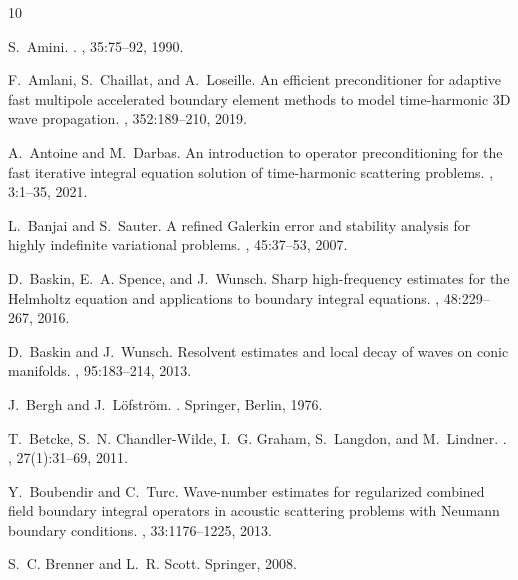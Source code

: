 \documentclass{birkjour}
\theoremstyle{definition}
\theoremstyle{remark}
\numberwithin{equation}{section}
\begin{document}
\begin{thebibliography}{10}

S.~Amini.
.
, 35:75--92, 1990.

F.~Amlani, S.~Chaillat, and A.~Loseille.
\newblock An efficient preconditioner for adaptive fast multipole accelerated
  boundary element methods to model time-harmonic 3{D} wave propagation.
, 352:189--210, 2019.

A.~Antoine and M.~Darbas.
\newblock An introduction to operator preconditioning for the fast iterative
  integral equation solution of time-harmonic scattering problems.
, 3:1--35, 2021.

L.~Banjai and S.~Sauter.
\newblock A refined {G}alerkin error and stability analysis for highly
  indefinite variational problems.
, 45:37--53, 2007.

D.~Baskin, E.~A. Spence, and J.~Wunsch.
\newblock Sharp high-frequency estimates for the {H}elmholtz equation and
  applications to boundary integral equations.
, 48:229--267, 2016.

D.~Baskin and J.~Wunsch.
\newblock Resolvent estimates and local decay of waves on conic manifolds.
, 95:183--214, 2013.

J.~Bergh and J.~L\"ofstr\"om.
.
\newblock Springer, Berlin, 1976.

T.~Betcke, S.~N. Chandler-Wilde, I.~G. Graham, S.~Langdon, and M.~Lindner.
.
, 27(1):31--69, 2011.

Y.~Boubendir and C.~Turc.
\newblock Wave-number estimates for regularized combined field boundary
  integral operators in acoustic scattering problems with {N}eumann boundary
  conditions.
, 33:1176--1225, 2013.

S.~C. Brenner and L.~R. Scott.
\newblock Springer, 2008.


\end{thebibliography}
\end{document}
